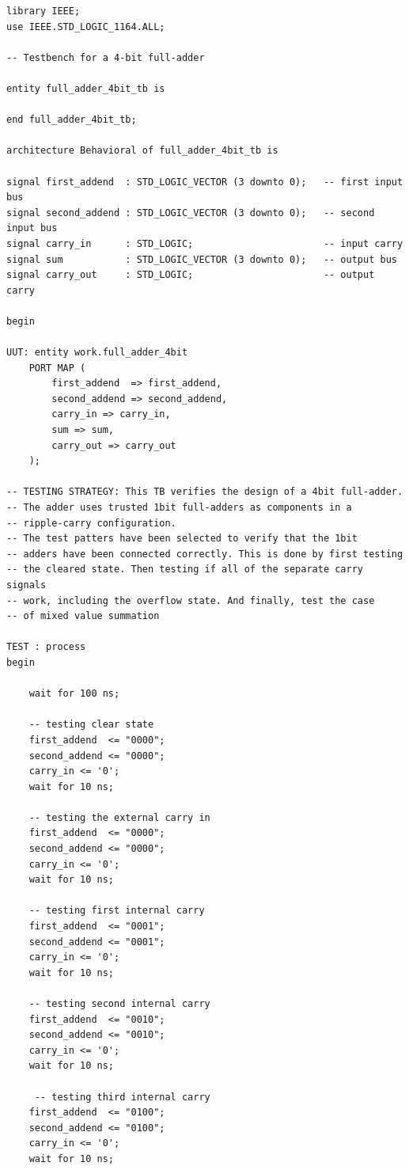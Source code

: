 \documentclass[11pt]{article}
\begin{document}
\begin{verbatim}
library IEEE;
use IEEE.STD_LOGIC_1164.ALL;

-- Testbench for a 4-bit full-adder

entity full_adder_4bit_tb is

end full_adder_4bit_tb;

architecture Behavioral of full_adder_4bit_tb is

signal first_addend  : STD_LOGIC_VECTOR (3 downto 0);   -- first input bus
signal second_addend : STD_LOGIC_VECTOR (3 downto 0);   -- second input bus
signal carry_in      : STD_LOGIC;                       -- input carry
signal sum           : STD_LOGIC_VECTOR (3 downto 0);   -- output bus
signal carry_out     : STD_LOGIC;                       -- output carry

begin 

UUT: entity work.full_adder_4bit
    PORT MAP (
        first_addend  => first_addend,
        second_addend => second_addend,
        carry_in => carry_in,
        sum => sum,
        carry_out => carry_out
    );

-- TESTING STRATEGY: This TB verifies the design of a 4bit full-adder.
-- The adder uses trusted 1bit full-adders as components in a 
-- ripple-carry configuration.
-- The test patters have been selected to verify that the 1bit 
-- adders have been connected correctly. This is done by first testing
-- the cleared state. Then testing if all of the separate carry signals
-- work, including the overflow state. And finally, test the case
-- of mixed value summation

TEST : process
begin

    wait for 100 ns;
    
    -- testing clear state
    first_addend  <= "0000";
    second_addend <= "0000";
    carry_in <= '0';
    wait for 10 ns;
    
    -- testing the external carry in
    first_addend  <= "0000";
    second_addend <= "0000";
    carry_in <= '0';
    wait for 10 ns;
    
    -- testing first internal carry
    first_addend  <= "0001";
    second_addend <= "0001";
    carry_in <= '0';
    wait for 10 ns;
    
    -- testing second internal carry
    first_addend  <= "0010";
    second_addend <= "0010";
    carry_in <= '0';
    wait for 10 ns;
    
     -- testing third internal carry
    first_addend  <= "0100";
    second_addend <= "0100";
    carry_in <= '0';
    wait for 10 ns;
\end{verbatim}
\end{document}
